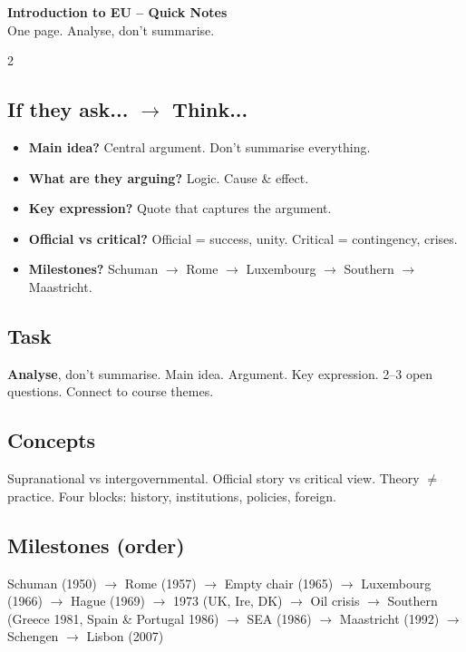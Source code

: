 \documentclass[10pt,landscape,a4paper]{article}
\begin{document}
\normalsize

\begin{center}
{\LARGE\bfseries\color{accent} Introduction to EU -- Quick Notes}\\[0.3em]
\small One page. Analyse, don't summarise.
\end{center}
\vspace{0.5em}

\begin{multicols}{2}

\subsection*{\color{accent} If they ask... $\to$ Think...}
\begin{itemize}[leftmargin=*,nosep]
\item \textbf{Main idea?} Central argument. Don't summarise everything.
\item \textbf{What are they arguing?} Logic. Cause \& effect.
\item \textbf{Key expression?} Quote that captures the argument.
\item \textbf{Official vs critical?} Official = success, unity. Critical = contingency, crises.
\item \textbf{Milestones?} Schuman $\to$ Rome $\to$ Luxembourg $\to$ Southern $\to$ Maastricht.
\end{itemize}

\subsection*{\color{accent} Task}
\textbf{Analyse}, don't summarise. Main idea. Argument. Key expression. 2--3 open questions. Connect to course themes.

\subsection*{\color{accent} Concepts}
Supranational vs intergovernmental. Official story vs critical view. Theory $\neq$ practice. Four blocks: history, institutions, policies, foreign.

\subsection*{\color{accent} Milestones (order)}
Schuman (1950) $\to$ Rome (1957) $\to$ Empty chair (1965) $\to$ Luxembourg (1966) $\to$ Hague (1969) $\to$ 1973 (UK, Ire, DK) $\to$ Oil crisis $\to$ Southern (Greece 1981, Spain \& Portugal 1986) $\to$ SEA (1986) $\to$ Maastricht (1992) $\to$ Schengen $\to$ Lisbon (2007)


\end{multicols}
\end{document}
